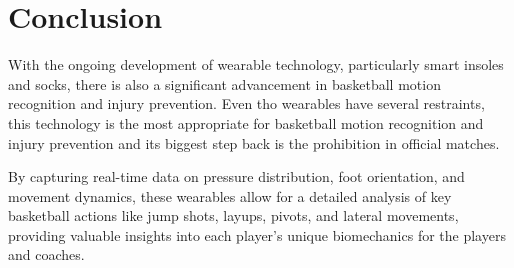 

%

\chapter{Conclusion}
\label{cha:conclusion}



With the ongoing development of wearable technology, particularly smart insoles and socks, there is also a significant advancement in basketball motion recognition and 
injury prevention. Even tho wearables have several restraints, this technology is the most appropriate for basketball motion recognition and injury prevention and its biggest step 
back is the prohibition in official matches.

By capturing real-time data on pressure distribution, foot orientation, and movement dynamics, these wearables allow for a 
detailed analysis of key basketball actions like jump shots, layups, pivots, and lateral movements, providing valuable insights into each player's unique biomechanics for the players 
and coaches. 
